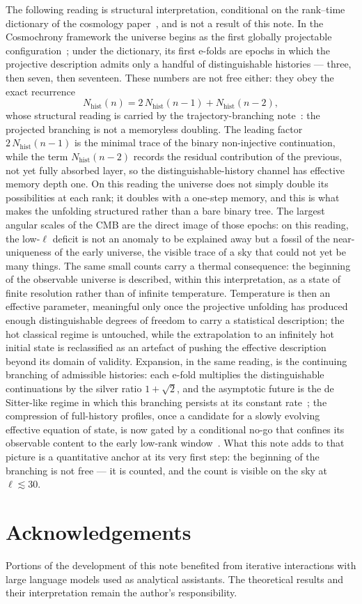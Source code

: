\documentclass[11pt]{article}
\newcommand{\Nhist}{N_{\mathrm{hist}}}
\begin{document}
The following reading is structural interpretation, conditional on the rank--time dictionary of
the cosmology paper~\cite{Beau2026d}, and is not a result of this note.
In the Cosmochrony framework the universe begins as the first globally projectable
configuration~\cite{Cosmochrony}; under the dictionary, its first e-folds are epochs in which the
projective description admits only a handful of distinguishable histories --- three, then seven,
then seventeen.
These numbers are not free either: they obey the exact recurrence
\[
\Nhist(n)=2\,\Nhist(n-1)+\Nhist(n-2),
\]
whose structural reading is carried by the trajectory-branching note~\cite{Beau2026tb}: the
projected branching is not a memoryless doubling.
The leading factor $2\,\Nhist(n-1)$ is the minimal trace of the binary non-injective continuation,
while the term $\Nhist(n-2)$ records the residual contribution of the previous, not yet fully
absorbed layer, so the distinguishable-history channel has effective memory depth one.
On this reading the universe does not simply double its possibilities at each rank; it doubles with
a one-step memory, and this is what makes the unfolding structured rather than a bare binary tree.
The largest angular scales of the CMB are the direct image of those epochs: on this reading, the
low-$\ell$ deficit is not an anomaly to be explained away but a fossil of the near-uniqueness of
the early universe, the visible trace of a sky that could not yet be many things.
The same small counts carry a thermal consequence: the beginning of the observable universe is
described, within this interpretation, as a state of finite resolution rather than of infinite
temperature.
Temperature is then an effective parameter, meaningful only once the projective unfolding has
produced enough distinguishable degrees of freedom to carry a statistical description; the hot
classical regime is untouched, while the extrapolation to an infinitely hot initial state is
reclassified as an artefact of pushing the effective description beyond its domain of validity.
Expansion, in the same reading, is the continuing branching of admissible histories: each e-fold
multiplies the distinguishable continuations by the silver ratio $1+\sqrt{2}$, and the asymptotic
future is the de Sitter-like regime in which this branching persists at its constant
rate~\cite{Beau2026tb}; the compression of full-history profiles, once a candidate for a slowly
evolving effective equation of state, is now gated by a conditional no-go that confines its
observable content to the early low-rank window~\cite{Beau2026tb}.
What this note adds to that picture is a quantitative anchor at its very first step: the beginning
of the branching is not free --- it is counted, and the count is visible on the sky at
$\ell\lesssim 30$.

\section*{Acknowledgements}
Portions of the development of this note benefited from iterative interactions with large language
models used as analytical assistants.
The theoretical results and their interpretation remain the author's responsibility.

\clearpage


\end{document}
